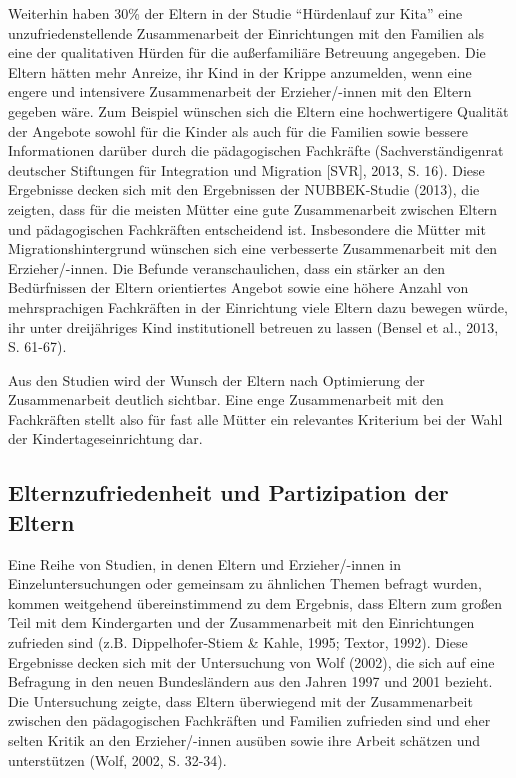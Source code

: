 \documentclass[12pt,a4paper]{article}
\begin{document}
Weiterhin haben 30\% der Eltern in der Studie "`Hürdenlauf zur Kita"' eine unzufriedenstellende Zusammenarbeit der Einrichtungen mit den Familien als eine der qualitativen Hürden für die außerfamiliäre Betreuung angegeben. Die Eltern hätten mehr Anreize, ihr Kind in der Krippe anzumelden, wenn eine engere und intensivere Zusammenarbeit der Erzieher/-innen mit den Eltern gegeben wäre. Zum Beispiel wünschen sich die Eltern eine hochwertigere Qualität der Angebote sowohl für die Kinder als auch für die Familien sowie bessere Informationen darüber durch die pädagogischen Fachkräfte (Sachverständigenrat deutscher Stiftungen für Integration und Migration [SVR], 2013, S. 16). Diese Ergebnisse decken sich mit den Ergebnissen der NUBBEK-Studie (2013), die zeigten, dass für die meisten Mütter eine gute Zusammenarbeit zwischen Eltern und pädagogischen Fachkräften entscheidend ist. Insbesondere die Mütter mit Migrationshintergrund wünschen sich eine verbesserte Zusammenarbeit mit den Erzieher/-innen. Die Befunde veranschaulichen, dass ein stärker an den Be\-dürf\-nis\-sen der Eltern orientiertes Angebot sowie eine höhere Anzahl von mehrsprachigen Fachkräften in der Einrichtung viele Eltern dazu bewegen würde, ihr unter drei\-jähri\-ges Kind institutionell betreuen zu lassen (Bensel et al., 2013, S. 61-67).

Aus den Studien wird der Wunsch der Eltern nach Optimierung der Zusammenarbeit deutlich sichtbar. Eine enge Zusammenarbeit mit den Fachkräften stellt also für fast alle Mütter ein relevantes Kriterium bei der Wahl der Kindertageseinrichtung dar.


\subsection{Elternzufriedenheit und Partizipation der Eltern}
Eine Reihe von Studien, in denen Eltern und Erzieher/-innen in Einzeluntersuchungen oder gemeinsam zu ähnlichen Themen befragt wurden, kommen weitgehend übereinstimmend zu dem Ergebnis, dass Eltern zum großen Teil mit dem Kindergarten und der Zusammenarbeit mit den Einrichtungen zufrieden sind (z.B. Dippelhofer-Stiem \& Kahle, 1995; Textor, 1992). Diese Ergebnisse decken sich mit der Untersuchung von Wolf (2002), die sich auf eine Befragung in den neuen Bundesländern aus den Jahren 1997 und 2001 bezieht. Die Untersuchung zeigte, dass Eltern überwiegend mit der Zusammenarbeit zwischen den pädagogischen Fachkräften und Familien zufrieden sind und eher selten Kritik an den Erzieher/-innen ausüben sowie ihre Arbeit schätzen und unterstützen (Wolf, 2002, S. 32-34).
\end{document}
